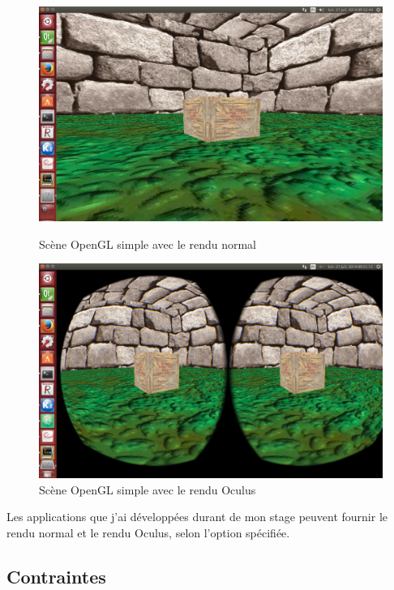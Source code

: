 \documentclass[a4paper,french,12pt]{article}
\begin{document}
			    \FloatBarrier
			    
			    \begin{figure}
			      \centering
				\includegraphics[width=1.0\textwidth]{scene_normal4.png}
			      \caption{Scène OpenGL simple avec le rendu normal}

				\includegraphics[width=1.0\textwidth]{scene_oculus4.png}
			      \caption{Scène OpenGL simple avec le rendu Oculus}
			    \end{figure}
			    \clearpage
			    
			    \FloatBarrier
			    
			    Les applications que j'ai développées durant de mon stage peuvent fournir le rendu normal 
			    et le rendu Oculus, selon l'option spécifiée.

		
	\subsection{Contraintes}
	
\end{document}
